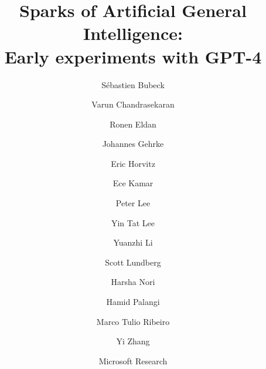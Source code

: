 \documentclass[11pt]{article}
\begin{document}


\title{%
\textbf{Sparks of Artificial General Intelligence:} \\
\textbf{Early experiments with GPT-4}}

\author{S\'ebastien Bubeck
\and Varun Chandrasekaran
\and Ronen Eldan
\and Johannes Gehrke
\and Eric Horvitz
\and Ece Kamar
\and Peter Lee
\and Yin Tat Lee
\and Yuanzhi Li
\and Scott Lundberg
\and Harsha Nori
\and Hamid Palangi
\and Marco Tulio Ribeiro
\and Yi Zhang
}

\date{Microsoft Research}

\maketitle



\tableofcontents
\end{document}
